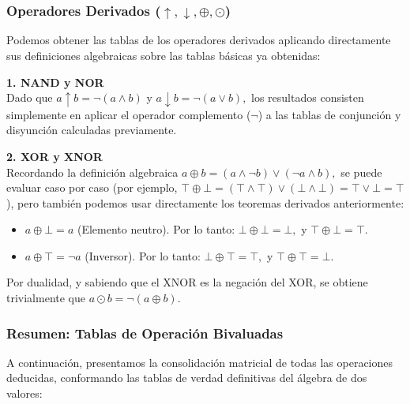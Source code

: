 \subsubsection{Operadores Derivados ($\uparrow, \downarrow, \oplus, \odot$)}
Podemos obtener las tablas de los operadores derivados aplicando directamente sus definiciones algebraicas sobre las tablas básicas ya obtenidas:

\textbf{1. NAND y NOR} \\
Dado que $a \uparrow b = \neg(a \wedge b)$ y $a \downarrow b = \neg(a \vee b),$ los resultados consisten simplemente en aplicar el operador complemento ($\neg$) a las tablas de conjunción y disyunción calculadas previamente.

\textbf{2. XOR y XNOR} \\
Recordando la definición algebraica $a \oplus b = (a \wedge \neg b) \vee (\neg a \wedge b),$ se puede evaluar caso por caso (por ejemplo, $\top \oplus \bot = (\top \wedge \top) \vee (\bot \wedge \bot) = \top \vee \bot = \top$), pero también podemos usar directamente los teoremas derivados anteriormente:
\begin{itemize}
    \item $a \oplus \bot = a$ (Elemento neutro). Por lo tanto: $\bot \oplus \bot = \bot,$ y $\top \oplus \bot = \top.$
    \item $a \oplus \top = \neg a$ (Inversor). Por lo tanto: $\bot \oplus \top = \top,$ y $\top \oplus \top = \bot.$
\end{itemize}
Por dualidad, y sabiendo que el XNOR es la negación del XOR, se obtiene trivialmente que $a \odot b = \neg(a \oplus b).$

\subsubsection{Resumen: Tablas de Operación Bivaluadas}
A continuación, presentamos la consolidación matricial de todas las operaciones deducidas, conformando las tablas de verdad definitivas del álgebra de dos valores:

